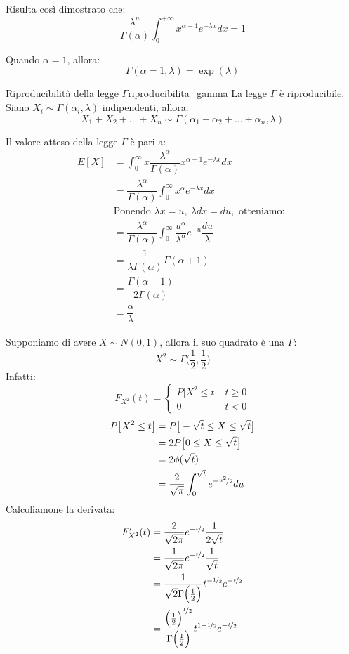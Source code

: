 \documentclass[12pt]{report}
\newcounter{theorem}
\newcommand{\nmu}{}
\begin{document}
	Risulta così dimostrato che:
	\[
	\dfrac{\lambda^n}{\Gamma(\alpha)}\int_{0}^{+\infty}x^{\alpha - 1}e^{-\lambda x}dx = 1
	\]
	\begin{note}{}{}
		Quando $\alpha = 1$, allora:
		\[
		\Gamma(\alpha = 1, \lambda) = \exp(\lambda)
		\]
	\end{note}
	\begin{theorem}{\nmu Riproducibilità della legge $\Gamma$}{riproducibilita_gamma}
		La legge $\Gamma$ è riproducibile. Siano $X_i \sim \Gamma(\alpha_i, \lambda)$ indipendenti, allora:
		\[
		X_1 + X_2 + \dots + X_n \sim \Gamma(\alpha_1 + \alpha_2 + \dots + \alpha_n, \lambda)
		\]
	\end{theorem}
	Il valore atteso della legge $\Gamma$ è pari a:
	\begin{align*}
	E[X] &= \int_{0}^{\infty}x\dfrac{\lambda^\alpha}{\Gamma(\alpha)}x^{\alpha - 1}e^{-\lambda x}dx \\
 	&= \dfrac{\lambda^\alpha}{\Gamma(\alpha)}\int_{0}^{\infty}x^{\alpha}e^{-\lambda x}dx \\
 	& \text{Ponendo } \lambda x= u,\ \lambda dx = du, \text{ otteniamo: } \\
 	&= \dfrac{\lambda^\alpha}{\Gamma(\alpha)}\int_{0}^{\infty}\dfrac{u^\alpha}{\lambda^\alpha}e^{-u}\dfrac{du}{\lambda} \\
 	&=\dfrac{1}{\lambda\Gamma(\alpha)}\Gamma(\alpha + 1) \\
 	&= \dfrac{\Gamma(\alpha + 1)}{2\Gamma(\alpha)} \\
 	&= \dfrac{\alpha}{\lambda}
	\end{align*}
	\begin{note}{}{}
		Supponiamo di avere $X \sim N(0,1)$, allora il suo quadrato è una $\Gamma$:
		\[
		X^2 \sim \Gamma\Bigg(\dfrac{1}{2}, \dfrac{1}{2}\Bigg)
		\]
		Infatti:
		\[
		F_{X^2}(t) = \begin{cases}
			P\big[X^2 \leq t\big] & t \geq 0 \\
			0 & t < 0
		\end{cases}
		\]
		\begin{align*}
			P\big[X^2 \leq t\big] &= P\big[-\sqrt{t} \leq X \leq \sqrt{t}\big] \\
			&= 2P\big[0 \leq X \leq \sqrt{t}\big] \\
			&= 2\phi(\sqrt{t}) \\
			&= \dfrac{2}{\sqrt{\pi}}\int_{0}^{\sqrt{t}}e^{-\nicefrac{u^2}{2}}du
		\end{align*}
		Calcoliamone la derivata:
		\begin{align*}
		F'_{X^2}(t) &= \frac{2}{\sqrt{2\pi}}e^{-\nicefrac{t}{2}}\frac{1}{2\sqrt{t}} \\
		&= \frac{1}{\sqrt{2\pi}}e^{-\nicefrac{t}{2}}\frac{1}{\sqrt{t}} \\
		&= \frac{1}{\sqrt{2}\Gamma\Big(\frac{1}{2}\Big)}t^{-\nicefrac{1}{2}}e^{-\nicefrac{t}{2}} \\
		&= \dfrac{\Big(\frac{1}{2}\Big)^{\nicefrac{1}{2}}}{\Gamma\Big(\frac{1}{2}\Big)}t^{1 - \nicefrac{1}{2}}e^{-\nicefrac{t}{2}}
		\end{align*}
	\end{note}
\end{document}
